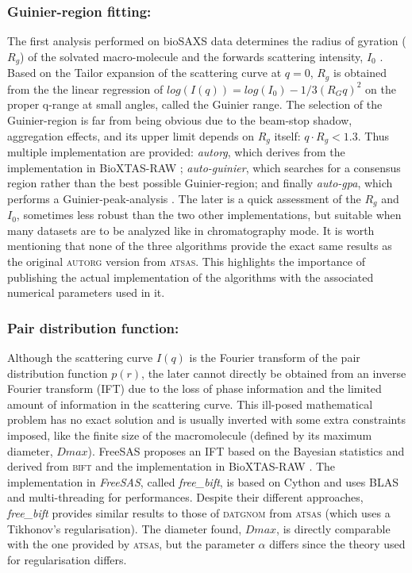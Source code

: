 \documentclass[preprint]{iucr}              %
\begin{document}
\subsubsection{Guinier-region fitting:}
The first analysis performed on bioSAXS data determines the radius of gyration ($R_g$) of the solvated macro-molecule and the forwards scattering intensity, $I_0$ \cite{guinier}.
Based on the Tailor expansion of the scattering curve at $q=0$, $R_g$ is obtained from the the linear regression of $log(I(q)) = log(I_0)-1/3 (R_{G}q)^{2}$ on the proper q-range at small angles, called the Guinier range.
The selection of the Guinier-region is far from being obvious due to the beam-stop shadow, aggregation effects, and its upper limit depends on $R_g$ itself: $q \cdot R_g<1.3$.
Thus multiple implementation are provided: \textit{autorg}, which derives from the implementation in BioXTAS-RAW \cite{bioxtasraw}; \textit{auto-guinier}, which searches for a consensus region rather than the best possible Guinier-region; and finally \textit{auto-gpa}, which performs a Guinier-peak-analysis \cite{gpa}. 
The later is a quick assessment of the $R_g$ and $I_0$, sometimes less robust than the two other implementations, but suitable when many datasets are to be analyzed like in chromatography mode.
It is worth mentioning that none of the three algorithms provide the exact same results as the original \textsc{autorg} \cite{ATSAS2} version from \textsc{atsas}. 
This highlights the importance of publishing the actual implementation of the algorithms with the associated numerical parameters used in it.
  
\subsubsection{Pair distribution function:}
Although the scattering curve $I(q)$ is the Fourier transform of the pair distribution function $p(r)$, the later cannot directly be obtained from an inverse Fourier transform (IFT) due to the loss of phase information and the limited amount of information in the scattering curve. 
This ill-posed mathematical problem has no exact solution and is usually inverted with some extra constraints imposed, like the finite size of the macromolecule (defined by its maximum diameter, $Dmax$).    
FreeSAS proposes an IFT based on the Bayesian statistics and derived from \textsc{bift} \cite{bift} and the implementation in BioXTAS-RAW \cite{BioXTAS}.
The implementation in \textit{FreeSAS}, called \textit{free\_bift}, is based on Cython \cite{cython} and uses BLAS\cite{blas} and multi-threading for performances.
Despite their different approaches, \textit{free\_bift} provides similar results to those of \textsc{datgnom} \cite{ATSAS1} from \textsc{atsas} (which uses a Tikhonov's regularisation).
The diameter found, $Dmax$, is directly comparable with the one provided by \textsc{atsas}, but the parameter $\alpha$ differs since the theory used for regularisation differs. 
\end{document}
